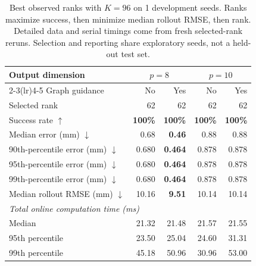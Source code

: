 \begin{table}[htbp]
    \centering
    \small
    \begin{tabular}{lrrrr}
        \toprule
        Output dimension & \multicolumn{2}{c}{$p=8$} & \multicolumn{2}{c}{$p=10$} \\
        \cmidrule(lr){2-3}\cmidrule(lr){4-5}
        Graph guidance & No & Yes & No & Yes \\
        \midrule
        Selected rank & 62 & 62 & 62 & 62 \\
        Success rate $\uparrow$ & \textbf{100\%} & \textbf{100\%} & \textbf{100\%} & \textbf{100\%} \\
        Median error (mm) $\downarrow$ & 0.68 & \textbf{0.46} & 0.88 & 0.88 \\
        90th-percentile error (mm) $\downarrow$ & 0.680 & \textbf{0.464} & 0.878 & 0.878 \\
        95th-percentile error (mm) $\downarrow$ & 0.680 & \textbf{0.464} & 0.878 & 0.878 \\
        99th-percentile error (mm) $\downarrow$ & 0.680 & \textbf{0.464} & 0.878 & 0.878 \\
        Median rollout RMSE (mm) $\downarrow$ & 10.16 & \textbf{9.51} & 10.14 & 10.14 \\
        \midrule
        \multicolumn{5}{l}{\textit{Total online computation time (ms)}} \\
        Median & 21.32 & 21.48 & 21.57 & 21.55 \\
        95th percentile & 23.50 & 25.04 & 24.60 & 31.31 \\
        99th percentile & 45.18 & 50.96 & 30.96 & 53.00 \\
        \bottomrule
    \end{tabular}
    \caption{Best observed ranks with $K=96$ on 1 development seeds. Ranks maximize success, then minimize median rollout RMSE, then rank. Detailed data and serial timings come from fresh selected-rank reruns. Selection and reporting share exploratory seeds, not a held-out test set.}
    \label{tab:best-ranks-k96-compact}
\end{table}

